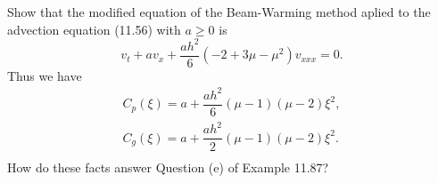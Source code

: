 \documentclass[lang=cn,a4paper,newtx,bibend=bibtex]{elegantpaper}
\begin{document}
\begin{prob}[Exercise 11.93]
  Show that the modified equation of the Beam-Warming method aplied to the advection equation (11.56) with $a\geq 0$ is
  \begin{equation*}
    v_t + av_x + \dfrac{ah^2}6(-2+3\mu-\mu^2)v_{xxx} = 0.
  \end{equation*}
  Thus we have
  \begin{equation*}
    \begin{aligned}
      C_p(\xi) = a + \dfrac{ah^2}6(\mu-1)(\mu-2)\xi^2,\\
      C_g(\xi) = a + \dfrac{ah^2}2(\mu-1)(\mu-2)\xi^2.\\      
    \end{aligned}
  \end{equation*}
  How do these facts answer Question (e) of Example 11.87?
\end{prob}
\end{document}
